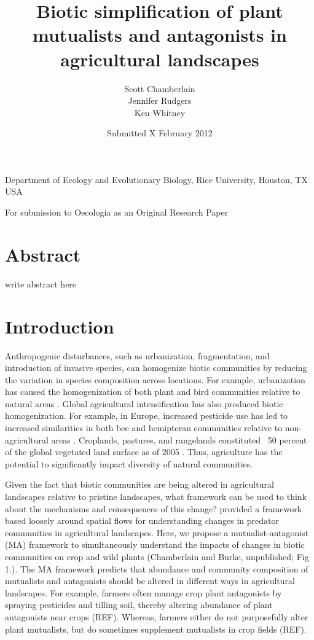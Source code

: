 \documentclass[12pt]{article}
\title{Biotic simplification of plant mutualists and antagonists in agricultural landscapes}
\author{Scott Chamberlain \\ Jennifer Rudgers \\ Ken Whitney}
\begin{document}
\maketitle

\begin{center}
Department of Ecology and Evolutionary Biology, Rice University, Houston, TX USA
\end{center}

\begin{center}
For submission to Oecologia as an Original Research Paper
\end{center}

\begin{center}
\date{Submitted X February 2012}
\end{center}
\newpage

\section{Abstract}

write abstract here

\section{Introduction}
Anthropogenic disturbances, such as urbanization, fragmentation, and introduction of invasive species, can homogenize biotic communities by reducing the variation in species composition across locations. For example, urbanization has caused the homogenization of both plant and bird communities relative to natural areas \citet{McKinney2006}. Global agricultural intensification has also produced biotic homogenization. For example, in Europe, increased pesticide use has led to increased similarities in both bee and hemipteran communities relative to non-agricultural areas \citet{Dormann2007}. Croplands, pastures, and rangelands constituted ~50 percent of the global vegetated land surface as of 2005 \citep{Foley2005}. Thus, agriculture has the potential to significantly impact diversity of natural communities. 

Given the fact that biotic communities are being altered in agricultural landscapes relative to pristine landscapes, what framework can be used to think about the mechanisms and consequences of this change?  \citet{Rand2006} provided a framework based loosely around spatial flows \citep[cf][]{Polis1997} for understanding changes in predator communities in agricultural landscapes.  Here, we propose a mutualist-antagonist (MA) framework to simultaneously understand the impacts of changes in biotic communities on crop and wild plants (Chamberlain and Burke, unpublished; Fig 1.). The MA framework predicts that abundance and community composition of mutualists and antagonists should be altered in different ways in agricultural landscapes.  For example, farmers often manage crop plant antagonists by spraying pesticides and tilling soil, thereby altering abundance of plant antagonists near crops (REF).  Whereas, farmers either do not purposefully alter plant mutualists, but do sometimes supplement mutualists in crop fields (REF). 
\end{document}
